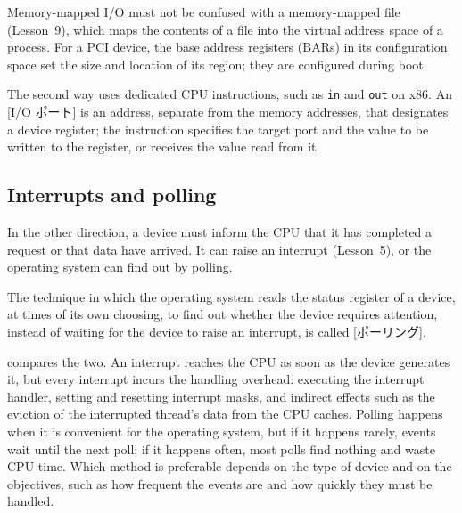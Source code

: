 \documentclass[../main.tex]{subfiles}
\begin{document}
Memory-mapped I/O must not be confused with a memory-mapped file
(Lesson~9), which maps the contents of a file into the virtual address
space of a process.  For a PCI device, the base address registers (BARs)
in its configuration space set the size and location of its region; they
are configured during boot.

The second way uses dedicated CPU instructions, such as \texttt{in} and
\texttt{out} on x86.  An [I/O ポート] is an address, separate
from the memory addresses, that designates a device register; the
instruction specifies the target port and the value to be written to the
register, or receives the value read from it.

\subsection{Interrupts and polling}

In the other direction, a device must inform the CPU that it has completed
a request or that data have arrived.  It can raise an interrupt (Lesson~5),
or the operating system can find out by polling.

\begin{definition}[Polling]
  The technique in which the operating system reads the status register of
  a device, at times of its own choosing, to find out whether the device
  requires attention, instead of waiting for the device to raise an
  interrupt, is called [ポーリング].
\end{definition}

 compares the two.  An interrupt reaches the CPU as
soon as the device generates it, but every interrupt incurs the handling
overhead: executing the interrupt handler, setting and resetting interrupt
masks, and indirect effects such as the eviction of the interrupted
thread's data from the CPU caches.  Polling happens when it is convenient
for the operating system, but if it happens rarely, events wait until the
next poll; if it happens often, most polls find nothing and waste CPU time.
Which method is preferable depends on the type of device and on the
objectives, such as how frequent the events are and how quickly they must be
handled.
\end{document}
